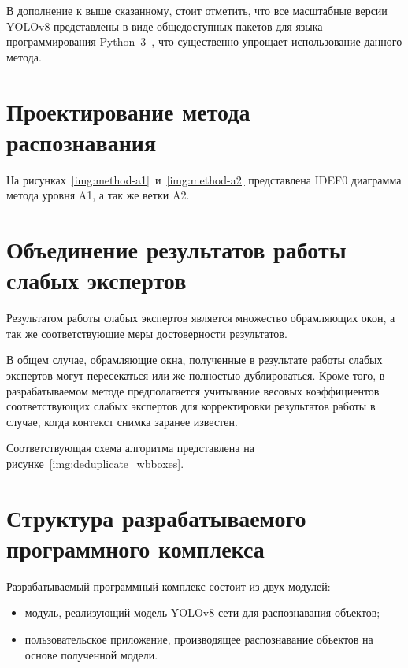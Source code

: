 В дополнение к выше сказанному, стоит отметить, что все масштабные версии YOLOv8 представлены в виде общедоступных пакетов для языка программирования Python~3~\cite{python3}, что существенно упрощает использование данного метода.

\section{Проектирование метода распознавания}

На рисунках~\ref{img:method-a1}~и~\ref{img:method-a2} представлена IDEF0 диаграмма метода уровня A1, а так же ветки A2.



\section{Объединение результатов работы слабых экспертов}

Результатом работы слабых экспертов является множество обрамляющих окон, а так же соответствующие меры достоверности результатов.

В общем случае, обрамляющие окна, полученные в результате работы слабых экспертов могут пересекаться или же полностью дублироваться. Кроме того, в разрабатываемом методе предполагается учитывание весовых коэффициентов соответствующих слабых экспертов для корректировки результатов работы в случае, когда контекст снимка заранее известен.

Соответствующая схема алгоритма представлена на рисунке~\ref{img:deduplicate_wbboxes}.

\clearpage


\clearpage

\section{Структура разрабатываемого программного комплекса}

Разрабатываемый программный комплекс состоит из двух модулей:
\begin{itemize}[label=---]
    \item модуль, реализующий модель YOLOv8 сети для распознавания объектов;
    \item пользовательское приложение, производящее распознавание объектов на основе полученной модели.
\end{itemize}

